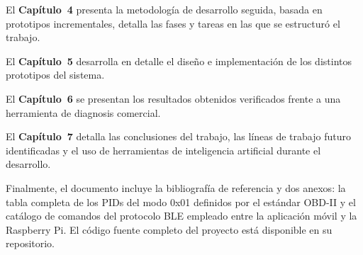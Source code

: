 El \textbf{Capítulo~4} presenta la metodología de desarrollo seguida, basada en prototipos incrementales, detalla las fases y tareas en las que se estructuró el trabajo.

El \textbf{Capítulo~5} desarrolla en detalle el diseño e implementación de los distintos prototipos del sistema.

El \textbf{Capítulo~6} se presentan los resultados obtenidos verificados frente a una herramienta de diagnosis comercial.

El \textbf{Capítulo~7} detalla las conclusiones del trabajo, las líneas de trabajo futuro identificadas y el uso de herramientas de inteligencia artificial durante el desarrollo.

Finalmente, el documento incluye la bibliografía de referencia y dos anexos: la tabla completa de los PIDs del modo 0x01 definidos por el estándar OBD-II y el catálogo de comandos del protocolo BLE empleado entre la aplicación móvil y la Raspberry Pi. El código fuente completo del proyecto está disponible en su repositorio.

